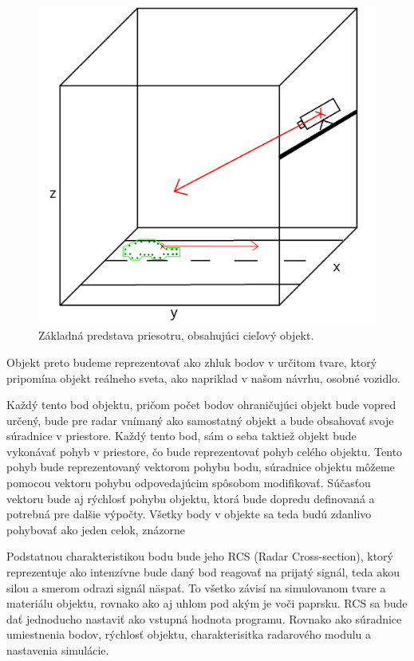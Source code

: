     \begin{figure}[h]
        \centering
        \includegraphics[width=.5\textwidth]{obrazky-figures/cube_radar_car.png}
        \caption{Základná predstava priesotru, obsahujúci cieľový objekt.}
        \label{fig:cube_radar_car}
    \end{figure}    

    Objekt preto budeme reprezentovať ako zhluk bodov v určitom tvare, ktorý pripomína objekt reálneho sveta, ako napriklad v našom návrhu, osobné vozidlo.

    Každý tento bod objektu, pričom počet bodov ohraničujúci objekt bude vopred určený, bude pre radar vnímaný ako samostatný objekt a bude obsahovať svoje súradnice v priestore.
    Každý tento bod, sám o seba taktiež objekt bude vykonávať pohyb v priestore, čo bude reprezentovať pohyb celého objektu. Tento pohyb bude reprezentovaný vektorom pohybu bodu, súradnice objektu môžeme pomocou vektoru pohybu odpovedajúcim spôsobom modifikovať.
    Súčasťou vektoru bude aj rýchlosť pohybu objektu, ktorá bude dopredu definovaná a potrebná pre dalšie výpočty. 
    Všetky body v objekte sa teda budú zdanlivo pohybovať ako jeden celok, znázorne

    Podstatnou charakteristikou bodu bude jeho RCS (Radar Cross-section), ktorý reprezentuje ako intenzívne bude daný bod reagovať na prijatý signál, teda akou silou a smerom odrazi signál näspať. To všetko závisí na simulovanom tvare a materiálu objektu, rovnako ako aj uhlom pod akým je voči paprsku. RCS sa bude dať jednoducho nastaviť ako vstupná hodnota programu. Rovnako ako súradnice umiestnenia bodov, rýchlosť objektu, charakterisitka radarového modulu a nastavenia simulácie.



